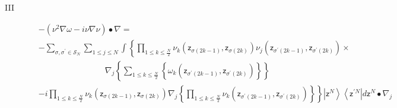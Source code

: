 \documentclass[aps,preprint]{revtex4}%
\begin{document}
\begin{description}
\item[III]
\begin{align}
&  -\left(  \nu^{2}\nabla\omega-i\nu\nabla\nu\right)  \bullet\nabla\left.
=\right. \nonumber\\
&  -%
{\displaystyle\sum\limits_{\sigma,\sigma^{\prime}\in\mathcal{S}_{N}}}
{\displaystyle\sum\limits_{1\leq j\leq N}}
\int\left\{
{\displaystyle\prod\limits_{1\leq k\leq\frac{N}{2}}}
\nu_{k}\left(  \mathsf{z}_{\sigma\left(  2k-1\right)  },\mathsf{z}%
_{\sigma\left(  2k\right)  }\right)  \nu_{j}\left(  \mathsf{z}_{\sigma
^{\prime}\left(  2k-1\right)  },\mathsf{z}_{\sigma^{\prime}\left(  2k\right)
}\right)  \right.  \times\nonumber\\
&  \qquad\qquad\qquad\qquad\nabla_{j}\left\{
{\displaystyle\sum\limits_{1\leq k\leq\frac{N}{2}}}
\left\{  \omega_{k}\left(  \mathsf{z}_{\sigma^{\prime}\left(  2k-1\right)
},\mathsf{z}_{\sigma^{\prime}\left(  2k\right)  }\right)  \right\}  \right\}
\nonumber\\
&  \left.  -i%
{\displaystyle\prod\limits_{1\leq k\leq\frac{N}{2}}}
\nu_{k}\left(  \mathsf{z}_{\sigma\left(  2k-1\right)  },\mathsf{z}%
_{\sigma\left(  2k\right)  }\right)  \nabla_{j}\left\{
{\displaystyle\prod\limits_{1\leq k\leq\frac{N}{2}}}
\nu_{k}\left(  \mathsf{z}_{\sigma^{\prime}\left(  2k-1\right)  }%
,\mathsf{z}_{\sigma^{\prime}\left(  2k\right)  }\right)  \right\}  \right\}
\left\vert \mathsf{z}^{N}\right\rangle \left\langle \mathsf{z}^{\prime
N}\right\vert d\mathsf{z}^{N}\bullet\nabla_{j}%
\end{align}



\end{description}
\end{document}
